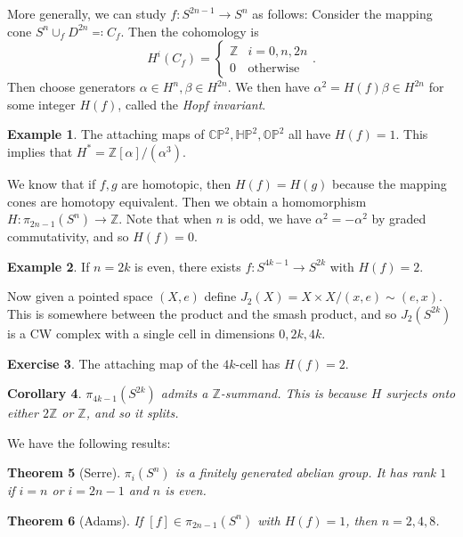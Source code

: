 \documentclass[leqno, openany]{memoir}
\newtheorem{thm}{Theorem}[section]
\newtheorem{cor}[thm]{Corollary}
\theoremstyle{definition}
\newtheorem{exm}[thm]{Example}
\newtheorem{exer}[thm]{Exercise}
\theoremstyle{remark}
\theoremstyle{plain}
\theoremstyle{definition}
\theoremstyle{remark}
\renewcommand{\H}{\mathbb{H}}
\newcommand{\C}{\mathbb{C}}
\newcommand{\Z}{\mathbb{Z}}
\renewcommand{\P}{\mathbb{P}}
\begin{document}
More generally, we can study $f \colon S^{2n-1} \to S^n$ as follows: Consider the mapping cone $S^n \cup_f D^{2n} \eqqcolon C_f$. Then the cohomology is
\[ H^i(C_f) = \begin{cases}
    \Z & i = 0, n, 2n \\
    0 & \text{otherwise}
\end{cases}. \]
Then choose generators $\alpha \in H^n, \beta \in H^{2n}$. We then have $\alpha^2 = H(f) \beta \in H^{2n}$ for some integer $H(f)$, called the \textit{Hopf invariant}.

\begin{exm}
    The attaching maps of $\C\P^2, \H\P^2, \mathbb{O}\P^2$ all have $H(f) = 1$. This implies that $H^* = \Z[\alpha]/(\alpha^3)$.
\end{exm}

We know that if $f,g$ are homotopic, then $H(f) = H(g)$ because the mapping cones are homotopy equivalent. Then we obtain a homomorphism $H \colon \pi_{2n-1}(S^n) \to \Z$. Note that when $n$ is odd, we have $\alpha^2 = -\alpha^2$ by graded commutativity, and so $H(f) = 0$.

\begin{exm}
    If $n = 2k$ is even, there exists $f \colon S^{4k-1} \to S^{2k}$ with $H(f) = 2$.
\end{exm}

Now given a pointed space $(X,e)$ define $J_2(X) = X \times X / (x,e) \sim (e,x)$. This is somewhere between the product and the smash product, and so $J_2(S^{2k})$ is a CW complex with a single cell in dimensions $0, 2k, 4k$.

\begin{exer}
    The attaching map of the $4k$-cell has $H(f) = 2$.
\end{exer}

\begin{cor}
    $\pi_{4k-1}(S^{2k})$ admits a $\Z$-summand. This is because $H$ surjects onto either $2\Z$ or $\Z$, and so it splits.
\end{cor}

We have the following results:

\begin{thm}[Serre]
    $\pi_i(S^n)$ is a finitely generated abelian group. It has rank $1$ if $i = n$ or $i = 2n-1$ and $n$ is even.
\end{thm}

\begin{thm}[Adams]
    If $[f] \in \pi_{2n-1}(S^n)$ with $H(f) = 1$, then $n = 2,4,8$.
\end{thm}
\end{document}
